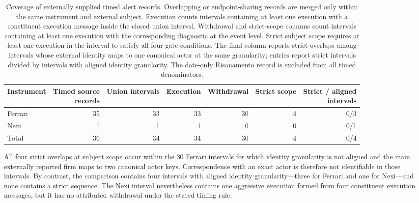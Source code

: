 \documentclass[11pt]{article}
\newenvironment{review}{\begingroup\color{blue}}{\endgroup}
\begin{document}
\begin{table}[htbp]
\centering
\caption{Coverage of externally supplied timed alert records. Overlapping or endpoint-sharing records are merged only within
the same instrument and external subject. Execution counts intervals containing at least one execution with a constituent execution message inside
the closed union interval. Withdrawal and strict-scope columns count intervals containing at least one execution with \begin{review}the corresponding diagnostic at the event level\end{review}. Strict subject scope requires at least one execution in the interval to satisfy all four
gate conditions. The final column reports strict overlaps among intervals whose external
identity maps to one canonical actor at the same granularity; entries report strict intervals divided by \begin{review}intervals with aligned identity granularity\end{review}. The date-only Risanamento record is excluded from all timed denominators.}
\label{tab:external_alert_overlap}
\scriptsize
\setlength{\tabcolsep}{4.2pt}
\begin{tabular}{@{}lrrrrrr@{}}
\toprule
Instrument & \shortstack{Timed source\\records} & Union intervals & Execution & Withdrawal & Strict scope & \shortstack{Strict / aligned\\intervals} \\
\midrule
Ferrari & 35 & 33 & 33 & 30 & 4 & 0/3 \\
Nexi & 1 & 1 & 1 & 0 & 0 & 0/1 \\
\midrule
Total & 36 & 34 & 34 & 30 & 4 & 0/4 \\
\bottomrule
\end{tabular}
\end{table}

\begin{review}All four strict overlaps at subject scope occur within the $30$ Ferrari intervals for which identity granularity is not aligned and the main externally reported firm maps to two canonical actor keys.\end{review} \begin{review}Correspondence with an exact actor\end{review} is therefore not identifiable in those intervals. By contrast,
the comparison contains four \begin{review}intervals with aligned identity granularity\end{review}---three for Ferrari and one for Nexi---and none contains a strict
sequence. The Nexi interval nevertheless contains one aggressive execution formed from four constituent execution messages, but it has
no attributed withdrawal under the stated timing rule.
\end{document}
